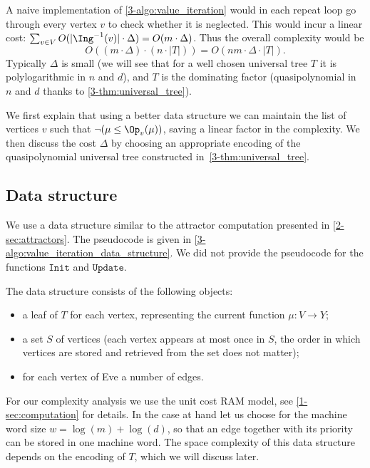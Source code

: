 A naive implementation of \cref{3-algo:value_iteration} would in each repeat loop go through every vertex $v$ 
to check whether it is neglected.
This would incur a linear cost: $\sum_{v \in V} O(|\Ing^{-1}(v)| \cdot \Delta) = O(m \cdot \Delta)$.
Thus the overall complexity would be
\[
O((m \cdot \Delta) \cdot (n \cdot |T|)) = O(nm \cdot \Delta \cdot |T|).
\]
Typically $\Delta$ is small (we will see that for a well chosen universal tree $T$ it is polylogarithmic in $n$ and $d$),
and $T$ is the dominating factor (quasipolynomial in $n$ and $d$ thanks to \cref{3-thm:universal_tree}).

We first explain that using a better data structure we can maintain the list of vertices $v$ such that $\neg (\mu \le \Op_v(\mu))$,
saving a linear factor in the complexity.
We then discuss the cost $\Delta$ by choosing an appropriate encoding of the quasipolynomial universal tree constructed in~\cref{3-thm:universal_tree}.

\subsection*{Data structure}
We use a data structure similar to the attractor computation presented in \cref{2-sec:attractors}.
The pseudocode is given in \cref{3-algo:value_iteration_data_structure}.
We did not provide the pseudocode for the functions $\texttt{Init}$ and $\texttt{Update}$.

The data structure consists of the following objects:
\begin{itemize}
	\item a leaf of $T$ for each vertex, representing the current function $\mu : V \to Y$;
	\item a set $S$ of vertices (each vertex appears at most once in $S$, the order in which vertices are stored and retrieved from the set does not matter);
	\item for each vertex of Eve a number of edges.
\end{itemize}
For our complexity analysis we use the unit cost RAM model, see \cref{1-sec:computation} for details.
In the case at hand let us choose for the machine word size $w = \log(m) + \log(d)$, 
so that an edge together with its priority can be stored in one machine word.
The space complexity of this data structure depends on the encoding of $T$, which we will discuss later.

